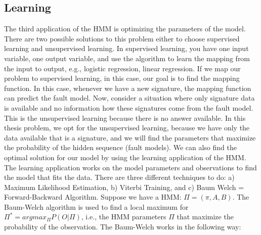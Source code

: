 \subsection{Learning}
The third application of the HMM is optimizing the parameters of the model. There are two possible solutions to this problem either to choose supervised learning and unsupervised learning.  In supervised learning, you have one input variable, one output variable, and use the algorithm to learn the mapping from the input to output, e.g., logistic regression, linear regression. If we  map our problem to supervised learning, in this case, our goal is to find the mapping function. In this case, whenever we have a new signature, the mapping function can predict the fault model. Now, consider a situation where only signature data is available and no information how these signatures come from the fault model.  This is the unsupervised learning because there is no answer available. In this thesis problem, we opt for the unsupervised learning, because we have only the data available that is a signature, and we will find the parameters that maximize the probability of the hidden sequence (fault models).  
We can also find the optimal solution for our model by using the learning application of the HMM. The learning application works on the model parameters and observations to find the model that fits the data. There are three different techniques to do: a) Maximum Likelihood Estimation, b) Viterbi Training, and c) Baum  Welch = Forward-Backward Algorithm. 
Suppose we have a HMM: $\Pi = (\pi, A, B)$. The Baum-Welch algorithm is used to find  a local maximum for $\Pi^* = arg max_{\Pi} P (O | \Pi)$, i.e., the HMM parameters $\Pi$ that maximize the probability of the observation.
The Baum-Welch works in the following way:
